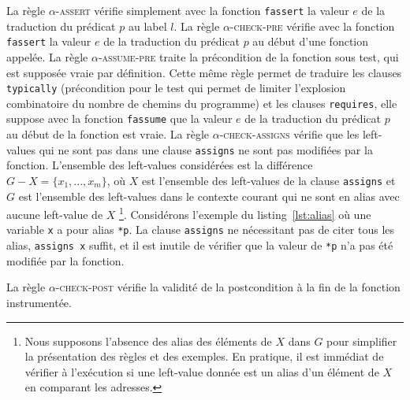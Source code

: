 La règle \textsc{$\alpha$-assert} vérifie simplement avec la fonction
\lstinline'fassert' la valeur $e$ de la traduction du prédicat $p$ au label $l$.
La règle \textsc{$\alpha$-check-pre} vérifie avec la fonction
\lstinline'fassert' la valeur $e$ de la traduction du prédicat $p$ au début
d'une fonction appelée.
La règle \textsc{$\alpha$-assume-pre} traite la précondition de la fonction sous
test, qui est supposée vraie par définition.
Cette même règle permet de traduire les clauses \lstinline'typically'
(précondition pour le test qui permet de limiter l'explosion combinatoire du
nombre de chemins du programme) et les clauses \lstinline'requires', elle
suppose avec la fonction \lstinline'fassume' que la valeur $e$ de la
traduction du prédicat $p$ au début de la fonction est vraie.
La règle \textsc{$\alpha$-check-assigns} vérifie que les left-values qui ne sont
pas dans une clause \lstinline'assigns' ne sont pas modifiées par la fonction.
L'ensemble des left-values considérées est la différence
$G-X = \{x_1, ..., x_m\}$, où  $X$ est l'ensemble des left-values de la clause
\lstinline'assigns' et $G$ est l'ensemble des left-values dans le
contexte courant qui ne sont en alias avec aucune left-value de $X$
\footnote{
  Nous supposons l'absence des alias des éléments de $X$ dans $G$ pour
  simplifier la présentation des règles et des exemples.
  En pratique, il est immédiat de vérifier à l'exécution si une left-value
  donnée est un alias d'un élément de $X$ en comparant les adresses.
}.
Considérons l'exemple du listing~\ref{lst:alias} où une variable \lstinline'x'
a pour alias \lstinline'*p'.
La clause \lstinline'assigns' ne nécessitant pas de citer tous les alias,
\lstinline'assigns x' suffit, et il est inutile de vérifier que la valeur de
\lstinline'*p' n'a pas été modifiée par la fonction.



La règle \textsc{$\alpha$-check-post} vérifie la validité de la postcondition
à la fin de la fonction instrumentée.



